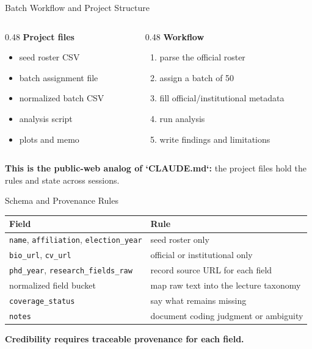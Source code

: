 \documentclass[10pt,english,aspectratio=169]{beamer}
\begin{document}
\begin{frame}{Batch Workflow and Project Structure}
\begin{columns}[T]
\begin{column}{0.48\textwidth}
\textbf{Project files}
\begin{itemize}
    \item seed roster CSV
    \item batch assignment file
    \item normalized batch CSV
    \item analysis script
    \item plots and memo
\end{itemize}
\end{column}
\begin{column}{0.48\textwidth}
\textbf{Workflow}
\begin{enumerate}
    \item parse the official roster
    \item assign a batch of 50
    \item fill official/institutional metadata
    \item run analysis
    \item write findings and limitations
\end{enumerate}
\end{column}
\end{columns}

\vspace{0.3cm}
\textbf{This is the public-web analog of `CLAUDE.md`:} the project files hold the rules and state across sessions.
\end{frame}

\begin{frame}{Schema and Provenance Rules}
\small
\begin{tabular}{p{3.4cm}p{8.4cm}}
\toprule
\textbf{Field} & \textbf{Rule} \\
\midrule
\texttt{name}, \texttt{affiliation}, \texttt{election\_year} & seed roster only \\
\texttt{bio\_url}, \texttt{cv\_url} & official or institutional only \\
\texttt{phd\_year}, \texttt{research\_fields\_raw} & record source URL for each field \\
normalized field bucket & map raw text into the lecture taxonomy \\
\texttt{coverage\_status} & say what remains missing \\
\texttt{notes} & document coding judgment or ambiguity \\
\bottomrule
\end{tabular}

\vspace{0.3cm}
\textbf{Credibility requires traceable provenance for each field.}
\end{frame}
\end{document}
